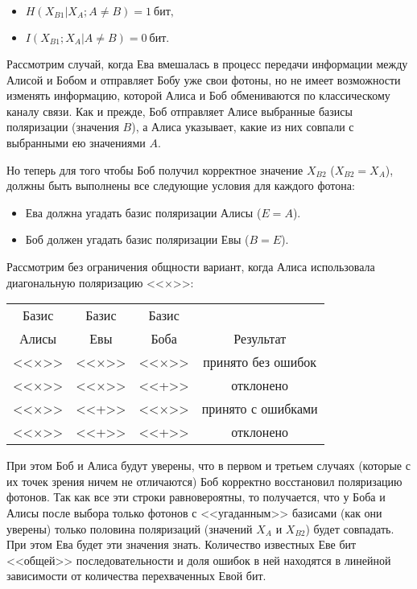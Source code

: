 \begin{itemize}
	\item $H \left( X_{B1} | X_A; A \neq B \right) = 1~\text{бит},$
	\item $I \left( X_{B1} ; X_A | A \neq B \right) = 0~\text{бит}.$
\end{itemize}

Рассмотрим случай, когда Ева вмешалась в процесс передачи информации между Алисой и Бобом и отправляет Бобу уже свои фотоны, но не имеет возможности изменять информацию, которой Алиса и Боб обмениваются по классическому каналу связи. Как и прежде, Боб отправляет Алисе выбранные базисы поляризации (значения $B$), а Алиса указывает, какие из них совпали с выбранными ею значениями $A$.

Но теперь для того чтобы Боб получил корректное значение $X_{B2}$ ($X_{B2} = X_A$), должны быть выполнены все следующие условия для каждого фотона:

\begin{itemize}
	\item Ева должна угадать базис поляризации Алисы ($E = A$).
	\item Боб должен угадать базис поляризации Евы ($B = E$).
\end{itemize}

Рассмотрим без ограничения общности вариант, когда Алиса использовала диагональную поляризацию <<×>>:

\begin{tabular}{ | c | c | c | c | }
\hline
Базис & Базис & Базис & \\
Алисы & Евы & Боба & Результат \\
\hline
<<×>> & <<×>> & <<×>> & принято без ошибок \\
<<×>> & <<×>> & <<+>> & отклонено \\
<<×>> & <<+>> & <<×>> & принято с ошибками\\
<<×>> & <<+>> & <<+>> & отклонено \\
\hline
\end{tabular}

При этом Боб и Алиса будут уверены, что в первом и третьем случаях (которые с их точек зрения ничем не отличаются) Боб корректно восстановил поляризацию фотонов. Так как все эти строки равновероятны, то получается, что у Боба и Алисы после выбора только фотонов с <<угаданным>> базисами (как они уверены) только половина поляризаций (значений $X_A$ и $X_{B2}$) будет совпадать. При этом Ева будет эти значения знать. Количество известных Еве бит <<общей>> последовательности и доля ошибок в ней находятся в линейной зависимости от количества перехваченных Евой бит.

